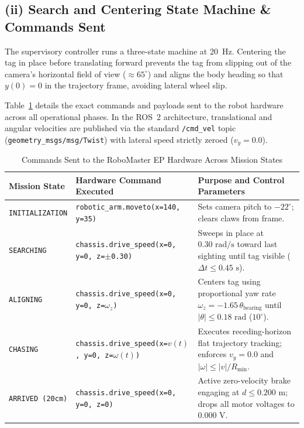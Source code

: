 \documentclass[10pt,a4paper]{article}
\begin{document}
\subsection*{(ii) Search and Centering State Machine \& Commands Sent}
The supervisory controller runs a three-state machine at 20~Hz. Centering the tag in place before translating forward prevents the tag from slipping out of the camera's horizontal field of view ($\approx 65^\circ$) and aligns the body heading so that $y(0) = 0$ in the trajectory frame, avoiding lateral wheel slip.

Table~\ref{tab:commands} details the exact commands and payloads sent to the robot hardware across all operational phases. In the ROS~2 architecture, translational and angular velocities are published via the standard \texttt{/cmd\_vel} topic (\texttt{geometry\_msgs/msg/Twist}) with lateral speed strictly zeroed ($v_y = 0.0$).

\begin{table}[h!]
\centering
\caption{Commands Sent to the RoboMaster EP Hardware Across Mission States}
\label{tab:commands}
\vspace{0.10cm}
\footnotesize
\begin{tabular}{p{2.3cm} p{4.6cm} p{8.8cm}}
\toprule
\textbf{Mission State} & \textbf{Hardware Command Executed} & \textbf{Purpose and Control Parameters} \\
\midrule
\texttt{INITIALIZATION} & \texttt{robotic\_arm.moveto(x=140, y=35)} & Sets camera pitch to $-22^\circ$; clears claws from frame. \\
\texttt{SEARCHING} & \texttt{chassis.drive\_speed(x=0, y=0, z=$\pm$0.30)} & Sweeps in place at $0.30\text{~rad/s}$ toward last sighting until tag visible ($\Delta t \le 0.45\text{~s}$). \\
\texttt{ALIGNING} & \texttt{chassis.drive\_speed(x=0, y=0, z=$\omega_z$)} & Centers tag using proportional yaw rate $\omega_z = -1.65\,\theta_{\text{bearing}}$ until $|\theta| \le 0.18\text{~rad}$ ($10^\circ$). \\
\texttt{CHASING} & \texttt{chassis.drive\_speed(x=$v(t)$, y=0, z=$\omega(t)$)} & Executes receding-horizon flat trajectory tracking; enforces $v_y = 0.0$ and $|\omega| \le |v| / R_{\min}$. \\
\texttt{ARRIVED (20cm)} & \texttt{chassis.drive\_speed(x=0, y=0, z=0)} & Active zero-velocity brake engaging at $d \le 0.200\text{~m}$; drops all motor voltages to $0.000\text{~V}$. \\
\bottomrule
\end{tabular}
\end{table}
\end{document}
